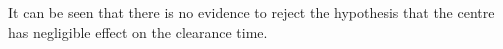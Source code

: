 It can be seen that there is no evidence to reject the hypothesis that the centre has negligible effect on the clearance time. 


